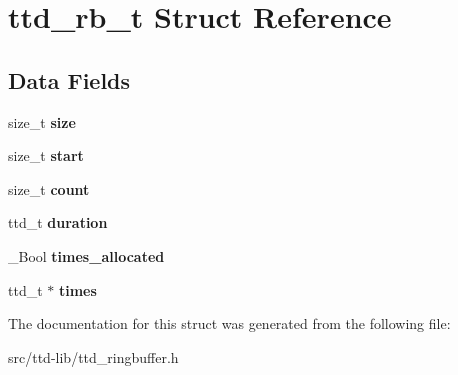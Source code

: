 \hypertarget{structttd__rb__t}{}\section{ttd\+\_\+rb\+\_\+t Struct Reference}
\label{structttd__rb__t}
\subsection*{Data Fields}
\begin{DoxyCompactItemize}
\item 
\hypertarget{structttd__rb__t_a033ad84b7ba51fe6e1ccd54adfe73806}{}size\+\_\+t {\bfseries size}\label{structttd__rb__t_a033ad84b7ba51fe6e1ccd54adfe73806}

\item 
\hypertarget{structttd__rb__t_a2b2b71d03d2a904761d84dfd0a72af3c}{}size\+\_\+t {\bfseries start}\label{structttd__rb__t_a2b2b71d03d2a904761d84dfd0a72af3c}

\item 
\hypertarget{structttd__rb__t_a650e0f47d412abf181b89b006302e99b}{}size\+\_\+t {\bfseries count}\label{structttd__rb__t_a650e0f47d412abf181b89b006302e99b}

\item 
\hypertarget{structttd__rb__t_a6865c25f64d54c46c10174c94d2bccd7}{}ttd\+\_\+t {\bfseries duration}\label{structttd__rb__t_a6865c25f64d54c46c10174c94d2bccd7}

\item 
\hypertarget{structttd__rb__t_adf86c06dc57d74784a073a7b73499120}{}\+\_\+\+Bool {\bfseries times\+\_\+allocated}\label{structttd__rb__t_adf86c06dc57d74784a073a7b73499120}

\item 
\hypertarget{structttd__rb__t_a5035b2afb2403faf886746ef5f0d0ae9}{}ttd\+\_\+t $\ast$ {\bfseries times}\label{structttd__rb__t_a5035b2afb2403faf886746ef5f0d0ae9}

\end{DoxyCompactItemize}


The documentation for this struct was generated from the following file\+:\begin{DoxyCompactItemize}
\item 
src/ttd-\/lib/ttd\+\_\+ringbuffer.\+h\end{DoxyCompactItemize}
